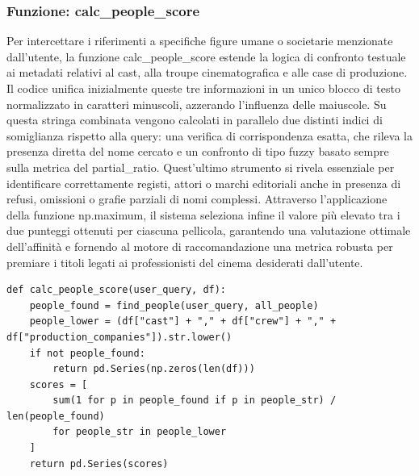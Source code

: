 \documentclass{article}
\begin{document}
\subsubsection{Funzione: calc\_people\_score}
Per intercettare i riferimenti a specifiche figure umane o societarie menzionate dall'utente, la funzione calc\_people\_score estende la logica di confronto testuale ai metadati relativi al cast, alla troupe cinematografica e alle case di produzione. Il codice unifica inizialmente queste tre informazioni in un unico blocco di testo normalizzato in caratteri minuscoli, azzerando l'influenza delle maiuscole. Su questa stringa combinata vengono calcolati in parallelo due distinti indici di somiglianza rispetto alla query: una verifica di corrispondenza esatta, che rileva la presenza diretta del nome cercato e un confronto di tipo fuzzy basato sempre sulla metrica del partial\_ratio. Quest'ultimo strumento si rivela essenziale per identificare correttamente registi, attori o marchi editoriali anche in presenza di refusi, omissioni o grafie parziali di nomi complessi. Attraverso l'applicazione della funzione np.maximum, il sistema seleziona infine il valore pi\`u elevato tra i due punteggi ottenuti per ciascuna pellicola, garantendo una valutazione ottimale dell'affinit\`a e fornendo al motore di raccomandazione una metrica robusta per premiare i titoli legati ai professionisti del cinema desiderati dall'utente.
\begin{lstlisting}
def calc_people_score(user_query, df):
	people_found = find_people(user_query, all_people)
	people_lower = (df["cast"] + "," + df["crew"] + "," + df["production_companies"]).str.lower()
	if not people_found:
		return pd.Series(np.zeros(len(df)))
	scores = [
		sum(1 for p in people_found if p in people_str) / len(people_found)
		for people_str in people_lower
	]
	return pd.Series(scores)
\end{lstlisting}
\end{document}

